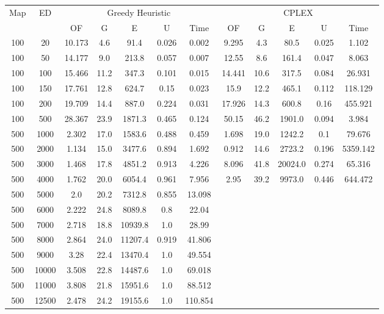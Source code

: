 \begin{table}[htb]
	\centering
	\begin{tabular}{|c|c|c|c|c|c|c|c|c|c|c|c|}
		\hline
		\multirow{2}{*}{Map} & \multirow{2}{*}{ED} & \multicolumn{5}{c|}{Greedy Heuristic} & \multicolumn{5}{c|}{CPLEX}\\ 
		\cline{3-12}
&& OF & G & E & U & Time & OF & G & E & U & Time\\ 
		\hline
		100 & 20 & 10.173 & 4.6 & 91.4 & 0.026 & 0.002 & 9.295 & 4.3 & 80.5 & 0.025 & 1.102 \\ 
		100 & 50 & 14.177 & 9.0 & 213.8 & 0.057 & 0.007 & 12.55 & 8.6 & 161.4 & 0.047 & 8.063 \\ 
		100 & 100 & 15.466 & 11.2 & 347.3 & 0.101 & 0.015 & 14.441 & 10.6 & 317.5 & 0.084 & 26.931 \\ 
		100 & 150 & 17.761 & 12.8 & 624.7 & 0.15 & 0.023 & 15.9 & 12.2 & 465.1 & 0.112 & 118.129 \\ 
		100 & 200 & 19.709 & 14.4 & 887.0 & 0.224 & 0.031 & 17.926 & 14.3 & 600.8 & 0.16 & 455.921 \\ 
		100 & 500 & 28.367 & 23.9 & 1871.3 & 0.465 & 0.124 & 50.15 & 46.2 & 1901.0 & 0.094 & 3.984 \\ 
		500 & 1000 & 2.302 & 17.0 & 1583.6 & 0.488 & 0.459 & 1.698 & 19.0 & 1242.2 & 0.1 & 79.676 \\ 
		500 & 2000 & 1.134 & 15.0 & 3477.6 & 0.894 & 1.692 & 0.912 & 14.6 & 2723.2 & 0.196 & 5359.142 \\ 
		500 & 3000 & 1.468 & 17.8 & 4851.2 & 0.913 & 4.226 & 8.096 & 41.8 & 20024.0 & 0.274 & 65.316 \\ 
		500 & 4000 & 1.762 & 20.0 & 6054.4 & 0.961 & 7.956 & 2.95 & 39.2 & 9973.0 & 0.446 & 644.472 \\ 
		500 & 5000 & 2.0 & 20.2 & 7312.8 & 0.855 & 13.098 & & & & &  \\ 
		500 & 6000 & 2.222 & 24.8 & 8089.8 & 0.8 & 22.04 & & & & &  \\ 
		500 & 7000 & 2.718 & 18.8 & 10939.8 & 1.0 & 28.99 & & & & &  \\ 
		500 & 8000 & 2.864 & 24.0 & 11207.4 & 0.919 & 41.806 & & & & &  \\ 
		500 & 9000 & 3.28 & 22.4 & 13470.4 & 1.0 & 49.554 & & & & &  \\ 
		500 & 10000 & 3.508 & 22.8 & 14487.6 & 1.0 & 69.018 & & & & &  \\ 
		500 & 11000 & 3.808 & 21.8 & 15951.6 & 1.0 & 88.512 & & & & &  \\ 
		500 & 12500 & 2.478 & 24.2 & 19155.6 & 1.0 & 110.854 & & & & &  \\ 

\end{tabular}
\end{table}
